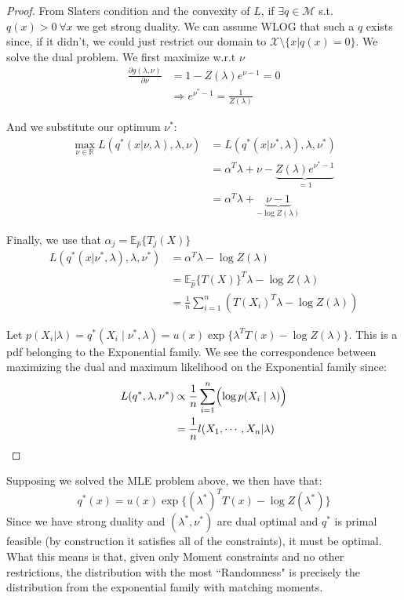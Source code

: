 \documentclass[]{article}
\theoremstyle{mattstyle}
\theoremstyle{definition}
\begin{document}
\begin{proof}
From Slaters condition and the convexity of $L$, if $\exists q \in \mathcal{M}$ s.t. $q(x)>0 \ \forall x$ we get strong duality. We can assume WLOG that such a $q$ exists since, if it didn't, we could just restrict our domain to $\mathcal{X} \setminus \{ x | q(x) = 0 \}$. We solve the dual problem. We first maximize w.r.t $\nu$
\begin{align*}
\frac{\partial  g(\lambda, \nu)}{\partial \nu } &= 1 - Z(\lambda)e^{\nu -1} = 0\\
&\Rightarrow  e^{\nu^*-1} = \frac{1}{Z(\lambda)}
\end{align*}

And we substitute our optimum $\nu^*$:
\begin{align*}
\max\limits_{\nu \in \mathbb{R}} L(q^*(x| \nu, \lambda),\lambda,\nu) &= L(q^*(x| \nu^*, \lambda),\lambda,\nu^*)\\
&= \alpha^T\lambda + \nu - \underbrace{Z(\lambda)e^{\nu^* -1}}_{=1}\\
&= \alpha^T\lambda + \underbrace{\nu - 1}_{-\log Z(\lambda)}
\end{align*}

Finally, we use that $\alpha_j = \mathbb{E}_{\hat{p}}\{T_j(X)\}$
\begin{align*}
L(q^*(x| \nu^*, \lambda),\lambda,\nu^*) &= \alpha^T\lambda -\log Z(\lambda)\\
&= \mathbb{E}_{\hat{p}}\{T(X)\}^T\lambda - \log Z(\lambda)\\
&= \frac{1}{n}\sum_{i=1}^n \left( T(X_i)^T\lambda - \log Z(\lambda) \right)
\end{align*}

Let  $p(X_i | \lambda) = q^*(X_i \mid \nu^*, \lambda) = u(x)\exp\{ \lambda^TT(x) - \log Z(\lambda)\}$. This is a pdf belonging to the Exponential family. We see the correspondence between maximizing the dual and maximum likelihood on the Exponential family since:
\begin{align*}
L(q^*,\lambda,\nu^*) &\propto \frac{1}{n}\sum_{i=1}^n \Bigl( \log p(X_i \mid \lambda) \Bigr) \\
&=\frac{1}{n}l(X_1, \cdots, X_n | \lambda)
\end{align*}
\end{proof}

Supposing we solved the MLE problem above, we then have that:
$$q^*(x)=u(x)\exp\{ (\lambda^*)^TT(x) - \log Z(\lambda^*)\}$$
Since we have strong duality and $(\lambda^*, \nu^*)$ are dual optimal and $q^*$ is primal feasible (by construction it satisfies all of the constraints), it must be optimal. What this means is that, given only Moment constraints and no other restrictions, the distribution with the most ``Randomness" is precisely the distribution from the exponential family with matching moments.

\newpage



\end{document}
